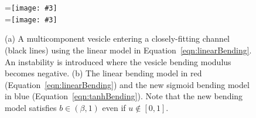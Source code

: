 \documentclass[twoside,twocolumn,9pt]{article}
\newcommand{\subfigimg}[3][,]{%
  \setbox1=\hbox{\texttt{[image: \#3]}}%
  \leavevmode\rlap{\usebox1}%
  \rlap{\hspace*{0pt}\raisebox{\dimexpr\ht1-0\baselineskip}{\bf
  \normalsize #2}}%
  \phantom{\usebox1}%
}
\begin{document}
\begin{figure}[h]
  \centering
  \subfigimg[width=0.9\linewidth, clip ]{(a)}{figures/OldBending.pdf} \\
  \subfigimg[width=0.9\linewidth, clip ]{(b)}{figures/concModels.pdf}
  \caption{\label{fig:concModels} \small (a) A multicomponent vesicle
  entering a closely-fitting channel (black lines) using the linear
  model in Equation~\eqref{eqn:linearBending}. An instability is
  introduced where the vesicle bending modulus becomes negative. (b) The
  linear bending model in red (Equation~\eqref{eqn:linearBending}) and
  the new sigmoid bending model in blue
  (Equation~\eqref{eqn:tanhBending}).  Note that the new bending model
  satisfies $b \in (\beta,1)$ even if $u \notin [0,1]$.}
\end{figure}





\end{document}
